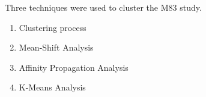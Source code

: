 Three techniques were used to cluster the M83 study.
\begin{enumerate}
\item Clustering process
\item Mean-Shift Analysis 
\item Affinity Propagation Analysis 
\item K-Means Analysis
\end{enumerate}